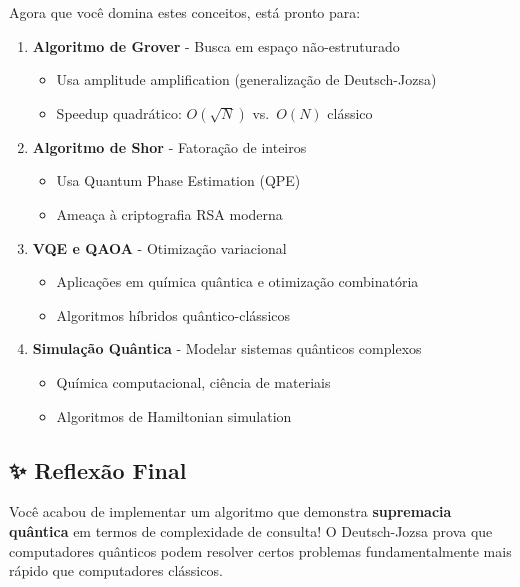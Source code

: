 \documentclass[
  brazilian,
]{report}
\providecommand{\tightlist}{%
  \setlength{\itemsep}{0pt}\setlength{\parskip}{0pt}}
\begin{document}
Agora que você domina estes conceitos, está pronto para:

\begin{enumerate}
\def\labelenumi{\arabic{enumi}.}
\tightlist
\item
  \textbf{Algoritmo de Grover} - Busca em espaço não-estruturado

  \begin{itemize}
  \tightlist
  \item
    Usa amplitude amplification (generalização de Deutsch-Jozsa)
  \item
    Speedup quadrático: \(O(\sqrt{N})\) vs.~\(O(N)\) clássico
  \end{itemize}
\item
  \textbf{Algoritmo de Shor} - Fatoração de inteiros

  \begin{itemize}
  \tightlist
  \item
    Usa Quantum Phase Estimation (QPE)
  \item
    Ameaça à criptografia RSA moderna
  \end{itemize}
\item
  \textbf{VQE e QAOA} - Otimização variacional

  \begin{itemize}
  \tightlist
  \item
    Aplicações em química quântica e otimização combinatória
  \item
    Algoritmos híbridos quântico-clássicos
  \end{itemize}
\item
  \textbf{Simulação Quântica} - Modelar sistemas quânticos complexos

  \begin{itemize}
  \tightlist
  \item
    Química computacional, ciência de materiais
  \item
    Algoritmos de Hamiltonian simulation
  \end{itemize}
\end{enumerate}

\subsection{✨ Reflexão Final}\label{reflexuxe3o-final}

Você acabou de implementar um algoritmo que demonstra \textbf{supremacia
quântica} em termos de complexidade de consulta! O Deutsch-Jozsa prova
que computadores quânticos podem resolver certos problemas
fundamentalmente mais rápido que computadores clássicos.
\end{document}
